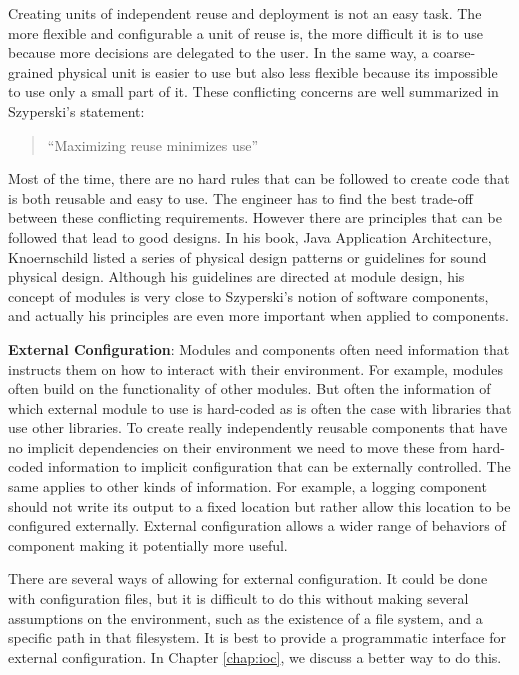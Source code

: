Creating units of independent reuse and deployment is not an easy task. The more flexible and
configurable a unit of reuse is, the more difficult it is to use because more decisions are
delegated to the user. In the same way, a coarse-grained physical unit is easier to use
but also less flexible because its impossible to  use only a small part of it. These 
conflicting concerns are well summarized in Szyperski's statement:

\begin{quotation}
``Maximizing reuse minimizes use'' 
\end{quotation}

Most of the time, there are no hard rules that can be followed to create code that is both reusable
and easy to use. The engineer has to find the best trade-off between these conflicting requirements.
However there are principles that can be followed that lead to good designs.
In his book, Java Application Architecture, Knoernschild listed a series of physical
design patterns or guidelines for sound physical design. Although his guidelines are directed
at module design, his concept of modules is very close to Szyperski's notion of software components,
and actually his principles are even more important when applied to components.

\textbf{External Configuration}:
Modules and components often need information that instructs them
on how to interact with their environment. For example, modules often build on the functionality
of other modules. But often the information of which external module to use is hard-coded as
is often the case with libraries that use other libraries. To create really independently reusable
components that have no implicit dependencies on their environment we need to move these
from hard-coded information to implicit configuration that can be externally controlled.
The same applies to other kinds of information. For example, a logging component should not
write its output to a fixed location but rather allow this location to be configured externally.
External configuration allows a wider range of behaviors of component making it potentially
more useful.

There are several ways of allowing for external configuration. It could be done with configuration
files, but it is difficult to do this without making several assumptions on the environment, such as
the existence of a file system, and a specific path in that filesystem. It is best to provide a
programmatic interface for external configuration. In Chapter \ref{chap:ioc}, we discuss a better
way to do this.

